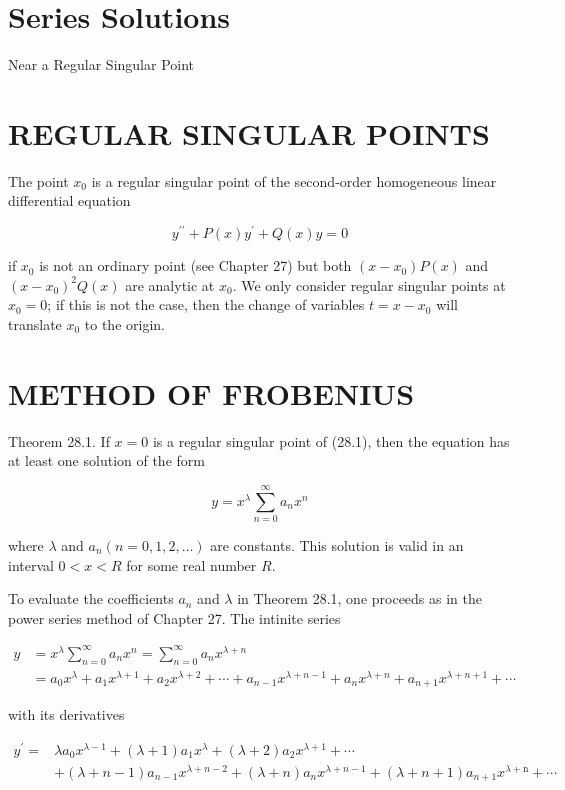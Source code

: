 \documentclass[10pt]{article}
\begin{document}
\section*{Series Solutions}
 Near a Regular Singular Point\section*{REGULAR SINGULAR POINTS}
The point $x_{0}$ is a regular singular point of the second-order homogeneous linear differential equation


\begin{equation*}
y^{\prime \prime}+P(x) y^{\prime}+Q(x) y=0 \tag{28.1}
\end{equation*}


if $x_{0}$ is not an ordinary point (see Chapter 27) but both $\left(x-x_{0}\right) P(x)$ and $\left(x-x_{0}\right)^{2} Q(x)$ are analytic at $x_{0}$. We only consider regular singular points at $x_{0}=0$; if this is not the case, then the change of variables $t=x-x_{0}$ will translate $x_{0}$ to the origin.

\section*{METHOD OF FROBENIUS}
Theorem 28.1. If $x=0$ is a regular singular point of (28.1), then the equation has at least one solution of the form

$$
y=x^{\lambda} \sum_{n=0}^{\infty} a_{n} x^{n}
$$

where $\lambda$ and $a_{n}(n=0,1,2, \ldots)$ are constants. This solution is valid in an interval $0<x<R$ for some real number $R$.

To evaluate the coefficients $a_{n}$ and $\lambda$ in Theorem 28.1, one proceeds as in the power series method of Chapter 27. The intinite series


\begin{align*}
y & =x^{\lambda} \sum_{n=0}^{\infty} a_{n} x^{n}=\sum_{n=0}^{\infty} a_{n} x^{\lambda+n} \\
& =a_{0} x^{\lambda}+a_{1} x^{\lambda+1}+a_{2} x^{\lambda+2}+\cdots+a_{n-1} x^{\lambda+n-1}+a_{n} x^{\lambda+n}+a_{n+1} x^{\lambda+n+1}+\cdots \tag{28.2}
\end{align*}


with its derivatives


\begin{align*}
y^{\prime}= & \lambda a_{0} x^{\lambda-1}+(\lambda+1) a_{1} x^{\lambda}+(\lambda+2) a_{2} x^{\lambda+1}+\cdots \\
& +(\lambda+n-1) a_{n-1} x^{\lambda+n-2}+(\lambda+n) a_{n} x^{\lambda+n-1}+(\lambda+n+1) a_{n+1} x^{\lambda+\mathrm{n}}+\cdots \tag{28.3}
\end{align*}
\end{document}
